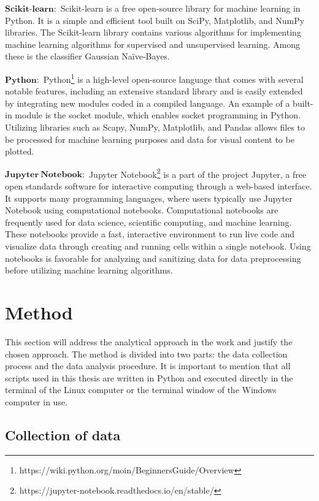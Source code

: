 $\mathbf{Scikit\text{-}learn:}$ Scikit-learn \cite{scikit-learn} is a free open-source library for machine learning in Python. It is a simple and efficient tool built on SciPy, Matplotlib, and NumPy libraries. The Scikit-learn library contains various algorithms for implementing machine learning algorithms for supervised and unsupervised learning. Among these is the classifier Gaussian Naïve-Bayes.

$\mathbf{Python}:$ Python\footnote[4]{https://wiki.python.org/moin/BeginnersGuide/Overview} is a high-level open-source language that comes with several notable features, including an extensive standard library and is easily extended by integrating new modules coded in a compiled language. An example of a built-in module is the socket module, which enables socket programming in Python. Utilizing libraries such as Scapy, NumPy, Matplotlib, and Pandas allows files to be processed for machine learning purposes and data for visual content to be plotted.

$\mathbf{Jupyter \ Notebook:}$ Jupyter Notebook\footnote[5]{https://jupyter-notebook.readthedocs.io/en/stable/} is a part of the project Jupyter, a free open standards software for interactive computing through a web-based interface. It supports many programming languages, where users typically use Jupyter Notebook using computational notebooks. Computational notebooks are frequently used for data science, scientific computing, and machine learning. These notebooks provide a fast, interactive environment to run live code and visualize data through creating and running cells within a single notebook. Using notebooks is favorable for analyzing and sanitizing data for data preprocessing before utilizing machine learning algorithms.

\section{Method\label{sec:method-methodology}}

This section will address the analytical approach in the work and justify the chosen approach. The method is divided into two parts: the data collection process and the data analysis procedure. It is important to mention that all scripts used in this thesis are written in Python and executed directly in the terminal of the Linux computer or the terminal window of the Windows computer in use. 

\subsection{Collection of data\label{subsec:collection-methodology}}


